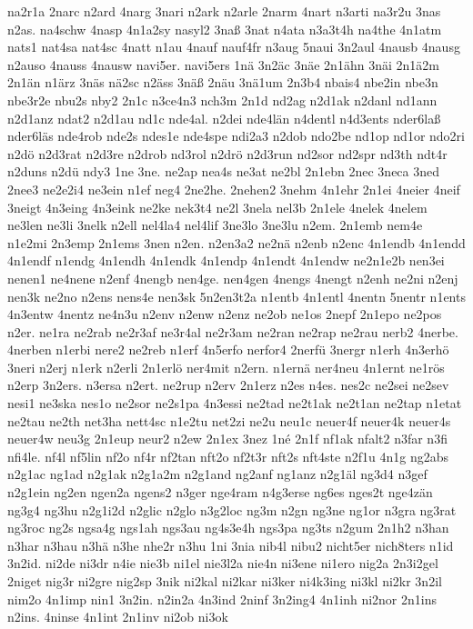 {na2r1a
2narc
n2ard
4narg
3nari
n2ark
n2arle
2narm
4nart
n3arti
na3r2u
3nas
n2as.
na4schw
4nasp
4n1a2sy
nasyl2
3naß
3nat
n4ata
n3a3t4h
na4the
4n1atm
nats1
nat4sa
nat4sc
4natt
n1au
4nauf
nauf4fr
n3aug
5naui
3n2aul
4nausb
4nausg
n2auso
4nauss
4nausw
navi5er.
navi5ers
1nä
3n2äc
3näe
2n1ähn
3näi
2n1ä2m
2n1än
n1ärz
3näs
nä2sc
n2äss
3näß
2näu
3nä1um
2n3b4
nbais4
nbe2in
nbe3n
nbe3r2e
nbu2s
nby2
2n1c
n3ce4n3
nch3m
2n1d
nd2ag
n2d1ak
n2danl
nd1ann
n2d1anz
ndat2
n2d1au
nd1c
nde4al.
n2dei
nde4län
n4dentl
n4d3ents
nder6laß
nder6läs
nde4rob
nde2s
ndes1e
nde4spe
ndi2a3
n2dob
ndo2be
nd1op
nd1or
ndo2ri
n2dö
n2d3rat
n2d3re
n2drob
nd3rol
n2drö
n2d3run
nd2sor
nd2spr
nd3th
ndt4r
n2duns
n2dü
ndy3
1ne
3ne.
ne2ap
nea4s
ne3at
ne2bl
2n1ebn
2nec
3neca
3ned
2nee3
ne2e2i4
ne3ein
n1ef
neg4
2ne2he.
2nehen2
3nehm
4n1ehr
2n1ei
4neier
4neif
3neigt
4n3eing
4n3eink
ne2ke
nek3t4
ne2l
3nela
nel3b
2n1ele
4nelek
4nelem
ne3len
ne3li
3nelk
n2ell
nel4la4
nel4lif
3ne3lo
3ne3lu
n2em.
2n1emb
nem4e
n1e2mi
2n3emp
2n1ems
3nen
n2en.
n2en3a2
ne2nä
n2enb
n2enc
4n1endb
4n1endd
4n1endf
n1endg
4n1endh
4n1endk
4n1endp
4n1endt
4n1endw
ne2n1e2b
nen3ei
nenen1
ne4nene
n2enf
4nengb
nen4ge.
nen4gen
4nengs
4nengt
n2enh
ne2ni
n2enj
nen3k
ne2no
n2ens
nens4e
nen3sk
5n2en3t2a
n1entb
4n1entl
4nentn
5nentr
n1ents
4n3entw
4nentz
ne4n3u
n2env
n2enw
n2enz
ne2ob
ne1os
2nepf
2n1epo
ne2pos
n2er.
ne1ra
ne2rab
ne2r3af
ne3r4al
ne2r3am
ne2ran
ne2rap
ne2rau
nerb2
4nerbe.
4nerben
n1erbi
nere2
ne2reb
n1erf
4n5erfo
nerfor4
2nerfü
3nergr
n1erh
4n3erhö
3neri
n2erj
n1erk
n2erli
2n1erlö
ner4mit
n2ern.
n1ernä
ner4neu
4n1ernt
ne1rös
n2erp
3n2ers.
n3ersa
n2ert.
ne2rup
n2erv
2n1erz
n2es
n4es.
nes2c
ne2sei
ne2sev
nesi1
ne3ska
nes1o
ne2sor
ne2s1pa
4n3essi
ne2tad
ne2t1ak
ne2t1an
ne2tap
n1etat
ne2tau
ne2th
net3ha
nett4sc
n1e2tu
net2zi
ne2u
neu1c
neuer4f
neuer4k
neuer4s
neuer4w
neu3g
2n1eup
neur2
n2ew
2n1ex
3nez
1né
2n1f
nf1ak
nfalt2
n3far
n3fi
nfi4le.
nf4l
nf5lin
nf2o
nf4r
nf2tan
nft2o
nf2t3r
nft2s
nft4ste
n2f1u
4n1g
ng2abs
n2g1ac
ng1ad
n2g1ak
n2g1a2m
n2g1and
ng2anf
ng1anz
n2g1äl
ng3d4
n3gef
n2g1ein
ng2en
ngen2a
ngens2
n3ger
nge4ram
n4g3erse
ng6es
nges2t
nge4zän
ng3g4
ng3hu
n2g1i2d
n2glic
n2glo
n3g2loc
ng3m
n2gn
ng3ne
ng1or
n3gra
ng3rat
ng3roc
ng2s
ngsa4g
ngs1ah
ngs3au
ng4s3e4h
ngs3pa
ng3ts
n2gum
2n1h2
n3han
n3har
n3hau
n3hä
n3he
nhe2r
n3hu
1ni
3nia
nib4l
nibu2
nicht5er
nich8ters
n1id
3n2id.
ni2de
ni3dr
n4ie
nie3b
ni1el
nie3l2a
nie4n
ni3ene
ni1ero
nig2a
2n3i2gel
2niget
nig3r
ni2gre
nig2sp
3nik
ni2kal
ni2kar
ni3ker
ni4k3ing
ni3kl
ni2kr
3n2il
nim2o
4n1imp
nin1
3n2in.
n2in2a
4n3ind
2ninf
3n2ing4
4n1inh
ni2nor
2n1ins
n2ins.
4ninse
4n1int
2n1inv
ni2ob
ni3ok
}
